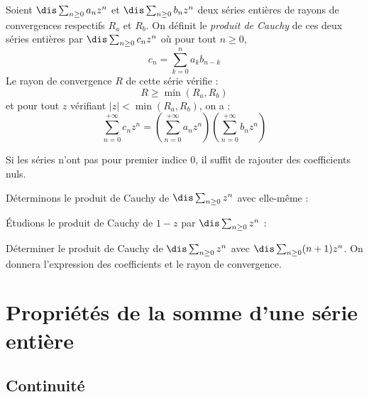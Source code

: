 \documentclass[a4paper,10pt]{report}
\begin{document}
\begin{thm}
Soient $\dis \sum_{n \geq 0} a_n z^n$ et $\dis \sum_{n \geq 0} b_n z^n$ deux séries entières de rayons de convergences respectifs $R_a$ et $R_b$. On définit le \textit{produit de Cauchy} de ces deux séries entières par $\dis \sum_{n \geq 0} c_n z^n$ où pour tout $n \geq 0$,
$$ c_n =  \sum_{k=0}^n a_k b_{n-k}  $$
Le rayon de convergence $R$ de cette série vérifie :
$$ R \geq \min(R_a,R_b)$$
et pour tout $z$ vérifiant $\vert z \vert < \min(R_a,R_b)$, on a :
$$ \sum_{n=0}^{+ \infty} c_n z^n = \left( \sum _{n=0}^{+ \infty} a_n z^n \right)  \left( \sum _{n=0}^{+ \infty} b_n z^n \right)$$
\end{thm}

\begin{rem} Si les séries n'ont pas pour premier indice $0$, il suffit de rajouter des coefficients nuls.
\end{rem}

\begin{preuve}

\vspace{4cm}
\end{preuve}

\begin{ex} Déterminons le produit de Cauchy de $\dis \sum_{n \geq 0} z^n$ avec elle-même :

\vspace{5cm}
\end{ex}

\newpage
\begin{ex} Étudions le produit de Cauchy de $1-z$ par $\dis \sum_{n \geq 0} z^n$ :

\vspace{6.5cm}
\end{ex}



\begin{exa} Déterminer le produit de Cauchy de $\dis \sum_{n \geq 0} z^n$ avec $\dis \sum_{n \geq 0} (n+1)z^n$. On donnera l'expression des coefficients et le rayon de convergence.
\end{exa}

\section{Propriétés de la somme d'une série entière}

\subsection{Continuité}
\end{document}
